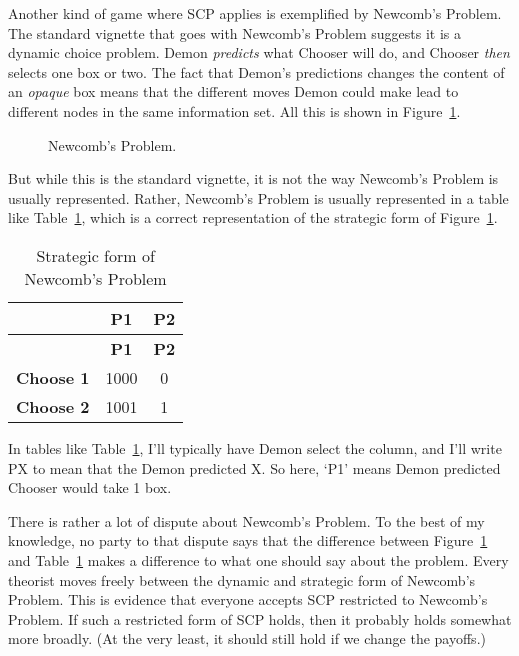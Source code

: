\documentclass[
  10pt,
  letterpaper,
  DIV=11,
  numbers=noendperiod,
  twoside]{scrartcl}
\begin{document}
Another kind of game where SCP applies is exemplified by Newcomb's
Problem. The standard vignette that goes with Newcomb's Problem suggests
it is a dynamic choice problem. Demon \emph{predicts} what Chooser will
do, and Chooser \emph{then} selects one box or two. The fact that
Demon's predictions changes the content of an \emph{opaque} box means
that the different moves Demon could make lead to different nodes in the
same information set. All this is shown in Figure~\ref{fig-newcomb}.

\begin{figure}


\caption{\label{fig-newcomb}Newcomb's Problem.}

\end{figure}%

But while this is the standard vignette, it is not the way Newcomb's
Problem is usually represented. Rather, Newcomb's Problem is usually
represented in a table like Table~\ref{tbl-newcomb}, which is a correct
representation of the strategic form of Figure~\ref{fig-newcomb}.

\begin{longtable}[]{@{}rcc@{}}
\caption{Strategic form of Newcomb's
Problem}\label{tbl-newcomb}\tabularnewline
\toprule\noalign{}
& \textbf{P1} & \textbf{P2} \\
\midrule\noalign{}
\endfirsthead
\toprule\noalign{}
& \textbf{P1} & \textbf{P2} \\
\midrule\noalign{}
\endhead
\bottomrule\noalign{}
\endlastfoot
\textbf{Choose 1} & 1000 & 0 \\
\textbf{Choose 2} & 1001 & 1 \\
\end{longtable}

In tables like Table~\ref{tbl-newcomb}, I'll typically have Demon select
the column, and I'll write PX to mean that the Demon predicted X. So
here, `P1' means Demon predicted Chooser would take 1 box.

There is rather a lot of dispute about Newcomb's Problem. To the best of
my knowledge, no party to that dispute says that the difference between
Figure~\ref{fig-newcomb} and Table~\ref{tbl-newcomb} makes a difference
to what one should say about the problem. Every theorist moves freely
between the dynamic and strategic form of Newcomb's Problem. This is
evidence that everyone accepts SCP restricted to Newcomb's Problem. If
such a restricted form of SCP holds, then it probably holds somewhat
more broadly. (At the very least, it should still hold if we change the
payoffs.)
\end{document}
